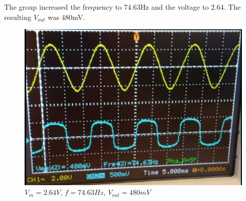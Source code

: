 \documentclass[twocolumn, amsmath]{revtex4}
\begin{document}



The group increased the frequency to 74.63Hz and the voltage to 2.64. The resulting $V_{out}$ was 480mV.

\begin{figure}[h]
    \includegraphics[scale=0.4]{480mV.png}  
    \caption{$V_{in} = 2.64V$, $f=74.63Hz$, $V_{out}= 480mV$}
\end{figure}
\end{document}
